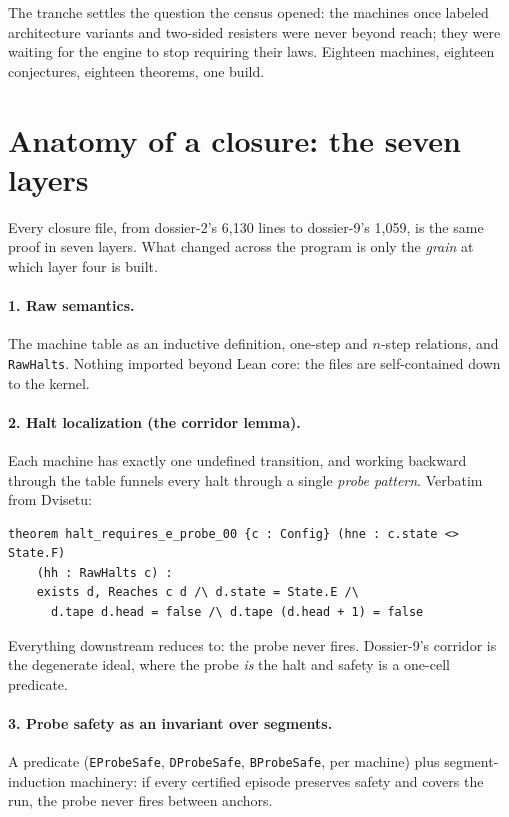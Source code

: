 \documentclass[11pt]{article}
\begin{document}
\noindent The tranche settles the question the census opened: the
machines once labeled architecture variants and two-sided resisters
were never beyond reach; they were waiting for the engine to stop
requiring their laws. Eighteen machines, eighteen conjectures,
eighteen theorems, one build.

\clearpage
\section*{Anatomy of a closure: the seven layers}

Every closure file, from dossier-2's 6{,}130 lines to dossier-9's
1{,}059, is the same proof in seven layers. What changed across the
program is only the \emph{grain} at which layer four is built.

\paragraph{1. Raw semantics.} The machine table as an inductive
definition, one-step and $n$-step relations, and \texttt{RawHalts}.
Nothing imported beyond Lean core: the files are self-contained down
to the kernel.

\paragraph{2. Halt localization (the corridor lemma).} Each machine
has exactly one undefined transition, and working backward through
the table funnels every halt through a single \emph{probe pattern}.
Verbatim from Dvisetu:
\begin{small}
\begin{verbatim}
theorem halt_requires_e_probe_00 {c : Config} (hne : c.state <> State.F)
    (hh : RawHalts c) :
    exists d, Reaches c d /\ d.state = State.E /\
      d.tape d.head = false /\ d.tape (d.head + 1) = false
\end{verbatim}
\end{small}
Everything downstream reduces to: the probe never fires. Dossier-9's
corridor is the degenerate ideal, where the probe \emph{is} the halt
and safety is a one-cell predicate.

\paragraph{3. Probe safety as an invariant over segments.} A
predicate (\texttt{EProbeSafe}, \texttt{DProbeSafe},
\texttt{BProbeSafe}, per machine) plus segment-induction machinery:
if every certified episode preserves safety and covers the run, the
probe never fires between anchors.
\end{document}
